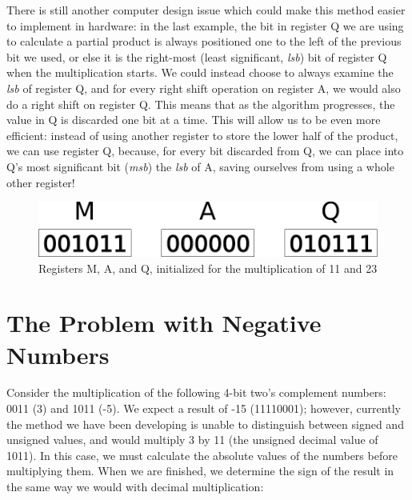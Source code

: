 \documentclass{article}
\begin{document}
There is still another computer design issue which could make this method easier to implement in hardware: in the last example, the bit in register Q we are using to calculate a partial product is always positioned one to the left of the previous bit we used, or else it is the right-most (least significant, \emph{lsb}) bit of register Q when the multiplication starts.
We could instead choose to always examine the \emph{lsb} of register Q, and for every right shift operation on register A, we would also do a right shift on register Q.
This means that as the algorithm progresses, the value in Q is discarded one bit at a time.%
This will allow us to be even more efficient: instead of using another register to store the lower half of the product, we can use register Q, because, for every bit discarded from Q, we can place into Q's most significant bit (\emph{msb}) the \emph{lsb} of A, saving ourselves from using a whole other register!

\begin{figure}[h]
\centering
\includegraphics[scale=0.4]{init.pdf}
\caption{Registers M, A, and Q, initialized for the multiplication of 11 and 23}
\end{figure}%

\pagebreak

\section{The Problem with Negative Numbers}
Consider the multiplication of the following 4-bit two's complement numbers: 0011 (3) and 1011 (-5).
We expect a result of -15 (11110001); however, currently the method we have been developing is unable to distinguish between signed and unsigned values, and would multiply 3 by 11 (the unsigned decimal value of 1011).
In this case, we must calculate the absolute values of the numbers before multiplying them.
When we are finished, we determine the sign of the result in the same way we would with decimal multiplication:
\end{document}
